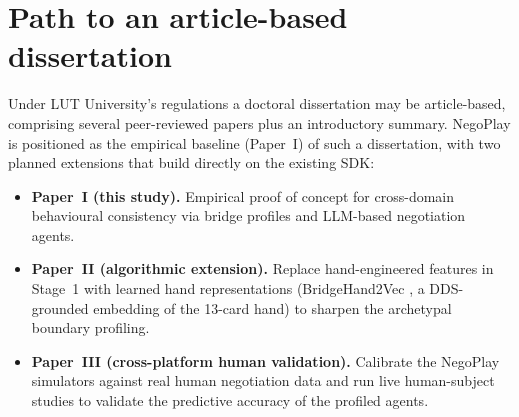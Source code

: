 \documentclass[11pt, a4paper, oneside, openany]{report}
\begin{document}
\section*{Path to an article-based dissertation}
Under LUT University's regulations a doctoral dissertation may be article-based,
comprising several peer-reviewed papers plus an introductory summary. NegoPlay
is positioned as the empirical baseline (Paper~I) of such a dissertation, with
two planned extensions that build directly on the existing SDK:

\begin{itemize}[leftmargin=*]
  \item \textbf{Paper~I (this study).} Empirical proof of concept for
        cross-domain behavioural consistency via bridge profiles and
        LLM-based negotiation agents.
  \item \textbf{Paper~II (algorithmic extension).} Replace hand-engineered
        features in Stage~1 with learned hand representations
        (BridgeHand2Vec \cite{sztyber2023}, a DDS-grounded embedding of the
        13-card hand) to sharpen the archetypal boundary profiling.
  \item \textbf{Paper~III (cross-platform human validation).} Calibrate the
        NegoPlay simulators against real human negotiation data and run live
        human-subject studies to validate the predictive accuracy of the
        profiled agents.
\end{itemize}
\end{document}
